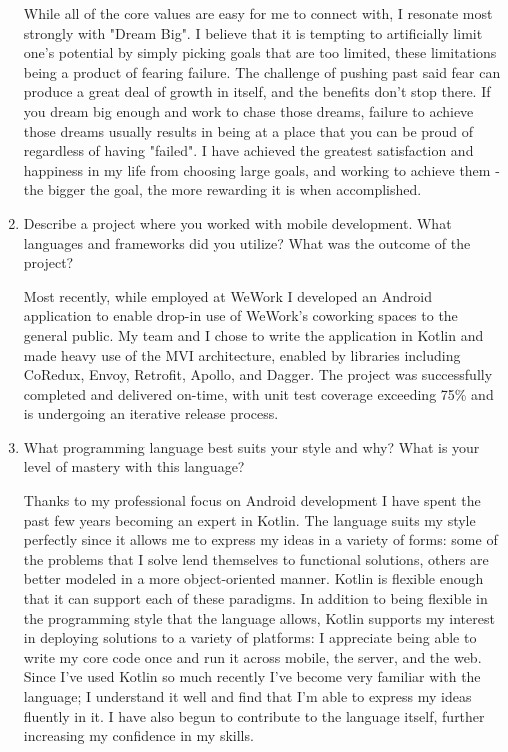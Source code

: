 \documentclass[9pt,letterpaper]{article}
\begin{document}
\begin{enumerate}
		While all of the core values are easy for me to connect with, I resonate most strongly with "Dream Big". I believe that it is tempting to artificially limit one's potential by simply picking goals that are too limited, these limitations being a product of fearing failure. The challenge of pushing past said fear can produce a great deal of growth in itself, and the benefits don't stop there. If you dream big enough and work to chase those dreams, failure to achieve those dreams usually results in being at a place that you can be proud of regardless of having "failed". I have achieved the greatest satisfaction and happiness in my life from choosing large goals, and working to achieve them - the bigger the goal, the more rewarding it is when accomplished.

	\item Describe a project where you worked with mobile development. What languages and frameworks did you utilize? What was the outcome of the project?

		Most recently, while employed at WeWork I developed an Android application to enable drop-in use of WeWork's coworking spaces to the general public. My team and I chose to write the application in Kotlin and made heavy use of the MVI architecture, enabled by libraries including CoRedux, Envoy, Retrofit, Apollo, and Dagger. The project was successfully completed and delivered on-time, with unit test coverage exceeding 75\% and is undergoing an iterative release process.

	\item What programming language best suits your style and why? What is your level of mastery with this language?

		Thanks to my professional focus on Android development I have spent the past few years becoming an expert in Kotlin. The language suits my style perfectly since it allows me to express my ideas in a variety of forms: some of the problems that I solve lend themselves to functional solutions, others are better modeled in a more object-oriented manner. Kotlin is flexible enough that it can support each of these paradigms. In addition to being flexible in the programming style that the language allows, Kotlin supports my interest in deploying solutions to a variety of platforms: I appreciate being able to write my core code once and run it across mobile, the server, and the web. Since I've used Kotlin so much recently I've become very familiar with the language; I understand it well and find that I'm able to express my ideas fluently in it. I have also begun to contribute to the language itself, further increasing my confidence in my skills.


\end{enumerate}
\end{document}
